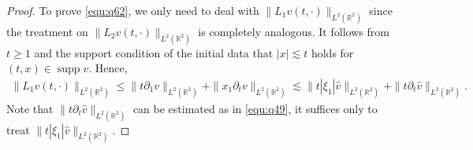 \documentclass[11pt,twoside]{article}
\newcommand{\R}{\mathbb R}
\newcommand{\p}{\partial}
\theoremstyle{plain}
\theoremstyle{definition}
\theoremstyle{remark}
\numberwithin{equation}{section}
\begin{document}
\begin{proof}
To prove \eqref{equ:q62}, we only need to deal with $\|L_1v(t, \cdot)\|_{L^2(\R^2)}$ since the treatment on $\|L_2v(t, \cdot)\|_{L^2(\R^2)}$ is completely analogous. It follows from $t\geq1$ and the support condition of the initial data that $|x|\lesssim t$ holds
for $(t, x)\in \operatorname{supp}v$. Hence,
\begin{equation}\label{equ:q63}
\begin{aligned}
\|L_1v(t, \cdot)\|_{L^2(\R^2)}\leq \|t\p_1v\|_{L^2(\R^2)}+\|x_1\p_tv\|_{L^2(\R^2)}
\lesssim \|t|\xi_1|\hat{v}\|_{L^2(\R^2)}+\|t\p_t\hat{v}\|_{L^2(\R^2)}.
\end{aligned}
\end{equation}
Note that $\|t\p_t\hat{v}\|_{L^2(\R^2)}$ can be estimated as in \eqref{equ:q49},
it suffices only to treat $\|t|\xi_1|\hat{v}\|_{L^2(\R^2)}$.


\end{proof}
\end{document}
